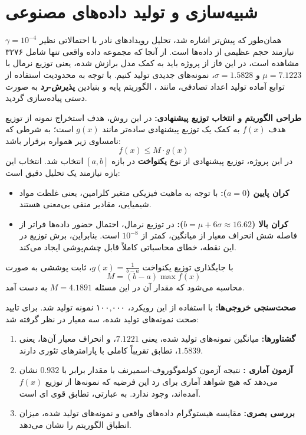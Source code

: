 \documentclass[12pt,a4paper]{article}
\begin{document}
	\section{شبیه‌سازی و تولید داده‌های مصنوعی }
	
	همان‌طور که پیش‌تر اشاره شد، تحلیل رویدادهای نادر با احتمالاتی نظیر $\gamma = 10^{-4}$ نیازمند حجم عظیمی از داده‌ها است. از آنجا که مجموعه داده واقعی تنها شامل ۳۲۷۶ مشاهده است، در این فاز از پروژه باید به کمک مدل برازش شده، یعنی توزیع نرمال با $\mu=7.1223$ و $\sigma=1.5828$، نمونه‌های جدیدی تولید کنیم. با توجه به محدودیت استفاده از توابع آماده تولید اعداد تصادفی، مانند ، الگوریتم پایه و بنیادین \textbf{پذیرش-رد } به صورت دستی پیاده‌سازی گردید.
	
	\textbf{طراحی الگوریتم و انتخاب توزیع پیشنهادی:}
	در این روش، هدف استخراج نمونه از توزیع هدف $f(x)$ به کمک یک توزیع پیشنهادی  ساده‌تر مانند $g(x)$ است؛ به شرطی که نامساوی زیر همواره برقرار باشد:
	\[
	f(x) \le M \cdot g(x)
	\]
	در این پروژه، توزیع پیشنهادی از نوع \textbf{یکنواخت } در بازه $[a,b]$ انتخاب شد. انتخاب این بازه نیازمند یک تحلیل دقیق است:
	
	\begin{itemize}
		\item \textbf{کران پایین ($a = 0$):} با توجه به ماهیت فیزیکی متغیر کلرامین، یعنی غلظت مواد شیمیایی، مقادیر منفی بی‌معنی هستند.
		\item \textbf{کران بالا ($b = \mu + 6\sigma \approx 16.62$):} در توزیع نرمال، احتمال حضور داده‌ها فراتر از فاصله شش انحراف معیار از میانگین، کمتر از $10^{-8}$ است. بنابراین، برش  توزیع در این نقطه، خطای محاسباتی کاملاً قابل چشم‌پوشی ایجاد می‌کند.
	\end{itemize}
	
	با جایگذاری توزیع یکنواخت $g(x) = \frac{1}{b-a}$، ثابت پوششی به صورت
	\[
	M = (b-a)\max f(x)
	\]
	محاسبه می‌شود که مقدار آن در این مسئله \textbf{$M = 4.1891$} به دست آمد.
	
	\textbf{صحت‌سنجی  خروجی‌ها:}
	با استفاده از این رویکرد، ۱۰۰,۰۰۰ نمونه تولید شد. برای تایید صحت نمونه‌های تولید شده، سه معیار در نظر گرفته شد:
	
\begin{enumerate}
	\item \textbf{گشتاورها:} میانگین نمونه‌های تولید شده، یعنی $7.1221$، و انحراف معیار آن‌ها، یعنی $1.5839$، تطابق تقریباً کاملی با پارامترهای تئوری دارند.
	\item \textbf{آزمون آماری :} نتیجه آزمون کولموگوروف-اسمیرنف با مقدار  برابر با $0.932$ نشان می‌دهد که هیچ شواهد آماری برای رد این فرضیه که نمونه‌ها از توزیع $f(x)$ آمده‌اند، وجود ندارد. به عبارتی، تطابق قوی ای است.
	\item \textbf{بررسی بصری:} مقایسه هیستوگرام داده‌های واقعی و نمونه‌های تولید شده، میزان انطباق الگوریتم را نشان می‌دهد.
\end{enumerate}
\end{document}

